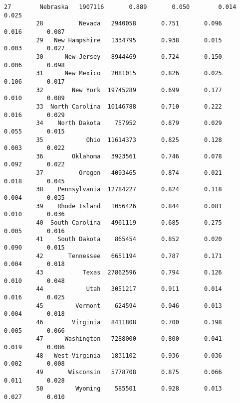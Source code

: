 \documentclass[11pt]{article}
\begin{document}
\begin{Verbatim}[commandchars=\\\{\}]
         27        Nebraska   1907116       0.889       0.050        0.014       0.025   
         28          Nevada   2940058       0.751       0.096        0.016       0.087   
         29   New Hampshire   1334795       0.938       0.015        0.003       0.027   
         30      New Jersey   8944469       0.724       0.150        0.006       0.098   
         31      New Mexico   2081015       0.826       0.025        0.106       0.017   
         32        New York  19745289       0.699       0.177        0.010       0.089   
         33  North Carolina  10146788       0.710       0.222        0.016       0.029   
         34    North Dakota    757952       0.879       0.029        0.055       0.015   
         35            Ohio  11614373       0.825       0.128        0.003       0.022   
         36        Oklahoma   3923561       0.746       0.078        0.092       0.022   
         37          Oregon   4093465       0.874       0.021        0.018       0.045   
         38    Pennsylvania  12784227       0.824       0.118        0.004       0.035   
         39    Rhode Island   1056426       0.844       0.081        0.010       0.036   
         40  South Carolina   4961119       0.685       0.275        0.005       0.016   
         41    South Dakota    865454       0.852       0.020        0.090       0.015   
         42       Tennessee   6651194       0.787       0.171        0.004       0.018   
         43           Texas  27862596       0.794       0.126        0.010       0.048   
         44            Utah   3051217       0.911       0.014        0.016       0.025   
         45         Vermont    624594       0.946       0.013        0.004       0.018   
         46        Virginia   8411808       0.700       0.198        0.005       0.066   
         47      Washington   7288000       0.800       0.041        0.019       0.086   
         48   West Virginia   1831102       0.936       0.036        0.002       0.008   
         49       Wisconsin   5778708       0.875       0.066        0.011       0.028   
         50         Wyoming    585501       0.928       0.013        0.027       0.010   
         

\end{Verbatim}
\end{document}
